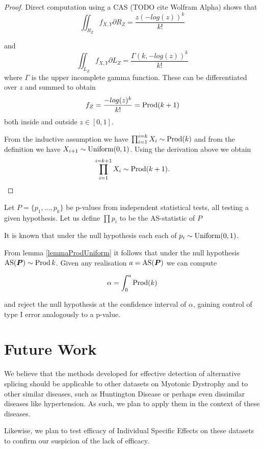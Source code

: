 \begin{proof}
Direct computation using a CAS (TODO cite Wolfram Alpha) shows that $$\iint_{R_{Z}}f_{X, Y}\partial R_{Z}=\frac{z(-log(z))^{k}}{k!}$$

and $$\iint_{L_{Z}}f_{X, Y}\partial L_{Z}=\frac{\Gamma(k, -log(z))^{k}}{k!}$$ where $\Gamma$ is the upper incomplete gamma function. These can be differentiated over $z$ and summed to obtain $$f_{Z}=\frac{-log(z)^{k}}{k!} = \operatorname{Prod}(k+1)$$ both inside and outside $z \in [0, 1]$.

From the inductive assumption we have $\prod_{i=1}^{i=k} X_{i} \sim \operatorname{Prod}(k)$ and from the definition we have $X_{i+1} \sim \operatorname{Uniform}(0, 1)$. Using the derivation above we obtain $$\prod_{i=1}^{i=k+1} X_{i} \sim \operatorname{Prod}(k+1).$$
\end{proof}

\begin{definition}[AS Statistic]
Let $P = \{p_{1}, \ldots , p_{k}\}$ be p-values from independent statistical tests, all testing a given hypothesis. Let us define $\prod{p_{i}}$ to be the AS-statistic of $P$
\end{definition}

It is known that under the null hypothesis each each of $p_{i} \sim \operatorname{Uniform}(0, 1)$.

From lemma \ref{lemmaProdUniform} it follows that under the null hypothesis $\operatorname{AS}(\boldsymbol{P}) \sim \operatorname{Prod}{k}$. Given any realisation $a = \operatorname{AS}(\boldsymbol{P})$ we can compute

$$\alpha = \int_{0}^{a}\operatorname{Prod}(k)$$

and reject the null hypothesis at the confidence interval of $\alpha$, gaining control of type I error analogously to a p-value.

\section{Future Work}

We believe that the methods developed for effective detection of alternative splicing should be applicable to other datasets on Myotonic Dystrophy and to other similar diseases, such as Huntington Disease or perhaps even dissimilar diseases like hypertension. As such, we plan to apply them in the context of these diseases.

Likewise, we plan to test efficacy of Individual Specific Effects on these datasets to confirm our suspicion of the lack of efficacy.

\printbibliography

